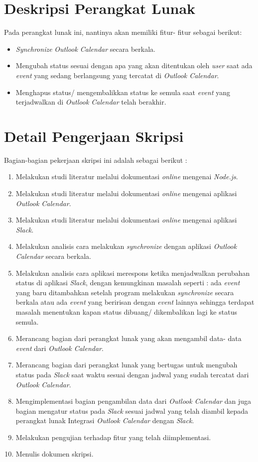 \documentclass[a4paper,twoside]{article}
\begin{document}
\section{Deskripsi Perangkat Lunak}
Pada perangkat lunak ini, nantinya akan memiliki fitur- fitur sebagai berikut:
\begin{itemize}
	\item \textit{Synchronize} \textit{Outlook Calendar} secara berkala. 
	\item Mengubah status sesuai dengan apa yang akan ditentukan oleh \textit{user} saat ada \textit{event} yang sedang berlangsung yang tercatat di \textit{Outlook Calendar}. 
	\item Menghapus status/ mengembalikkan status ke semula saat \textit{event} yang terjadwalkan di \textit{Outlook Calendar} telah berakhir. 
	
\end{itemize}

\section{Detail Pengerjaan Skripsi}
Bagian-bagian pekerjaan skripsi ini adalah sebagai berikut :
	\begin{enumerate}
		\item Melakukan studi literatur melalui dokumentasi \textit{online} mengenai \textit{Node.js}.
		\item Melakukan studi literatur melalui dokumentasi \textit{online} mengenai aplikasi \textit{Outlook Calendar}.
		\item Melakukan studi literatur melalui dokumentasi \textit{online} mengenai aplikasi \textit{Slack}. 
		\item Melakukan analisis cara melakukan \textit{synchronize} dengan aplikasi \textit{Outlook Calendar} secara berkala.
		\item Melakukan analisis cara aplikasi merespons ketika menjadwalkan perubahan status di aplikasi \textit{Slack}, dengan kemungkinan masalah seperti : ada \textit{event} yang baru ditambahkan setelah program melakukan \textit{synchronize} secara berkala atau ada \textit{event} yang beririsan dengan \textit{event} lainnya sehingga terdapat masalah menentukan kapan status dibuang/ dikembalikan lagi ke status semula. 
		\item Merancang bagian dari perangkat lunak yang akan mengambil data- data \textit{event} dari \textit{Outlook Calendar}. 
		\item Merancang bagian dari perangkat lunak yang bertugas untuk mengubah status pada \textit{Slack} saat waktu sesuai dengan jadwal yang sudah tercatat dari \textit{Outlook Calendar}.
		\item Mengimplementasi bagian pengambilan data dari \textit{Outlook Calendar} dan juga bagian mengatur status pada \textit{Slack} sesuai jadwal yang telah diambil kepada perangkat lunak Integrasi \textit{Outlook Calendar} dengan \textit{Slack}.
		\item Melakukan pengujian terhadap fitur yang telah diimplementasi.
		\item Menulis dokumen skripsi.   
	\end{enumerate}
\end{document}
